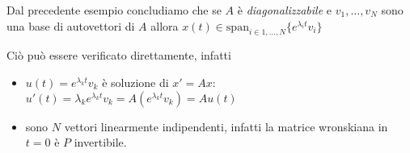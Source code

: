Dal precedente esempio concludiamo che se \(A\) è \emph{diagonalizzabile} e
\(v_{1}, \dots, v_{N}\) sono una base di autovettori di \(A\) allora \(x{(t)}
\in \mathrm{span}_{i \in 1, \dots, N} \{e^{\lambda_{i}t}v_{i}\} \) 
\begin{remark}
    Ciò può essere verificato direttamente, infatti
\begin{itemize}[label = --]
    \item \(u{(t)} = e^{\lambda_{k}t} v_{k}\) è soluzione di \(x' = Ax\):
        \(u'{(t)} = \lambda_{k}e^{\lambda_{k}t}v_{k} = A(e^{\lambda_{k}t}v_{k})
        = Au{(t)}\) 
    \item sono \(N\) vettori linearmente indipendenti, infatti la matrice
        wronskiana in \(t= 0\) è \(P\) invertibile.
\end{itemize}
\end{remark}

